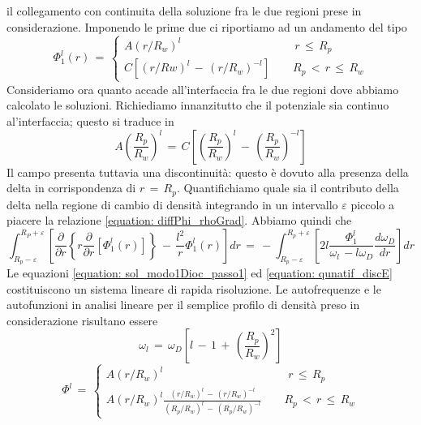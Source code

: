 il collegamento con continuita della soluzione fra le due regioni prese in considerazione. Imponendo le prime due ci riportiamo ad un
andamento del tipo
\begin{equation}
    \Phi_1^l\left(r\right)\,=\,
    \begin{cases}
        A\left(r/R_w\right)^l \qquad \qquad \qquad \qquad \qquad r\,\leq\,R_p\\
        C\left[\left(r/Rw\right)^l\,-\,\left(r/R_w\right)^{-l}\right] \qquad R_p\,<\,r\,\leq\,R_w
    \end{cases}
    \label{equation: sol_modo1Dioc_passo1}
\end{equation}
Consideriamo ora quanto accade all'interfaccia fra le due regioni dove abbiamo calcolato le soluzioni. Richiediamo innanzitutto che
il potenziale sia continuo al'interfaccia; questo si traduce in
\begin{equation}
    A\left(\frac{R_p}{R_w}\right)^l\,=\,C\left[\left(\frac{R_p}{R_w}\right)^l\,-\,\left(\frac{R_p}{R_w}\right)^{-l}\right]
\end{equation}
Il campo presenta tuttavia una discontinuità: questo è dovuto alla presenza della delta in corrispondenza di $r\,=\,R_p$. Quantifichiamo 
quale sia il contributo della delta nella regione di cambio di densità integrando in un intervallo $\varepsilon$ piccolo a piacere la
relazione \eqref{equation: diffPhi_rhoGrad}. Abbiamo quindi che 
\begin{equation}
    \int_{R_p-\varepsilon}^{R_P+\varepsilon} \left[    \frac{\partial}{\partial r}\left\{r\frac{\partial}{\partial r}\left[\Phi^l_1\left(r\right)\right]\right\}\,-\,\frac{l^2}{r}\Phi_1^l\left(r\right)\right] dr\,=\,-\int_{R_p-\varepsilon}^{R_p+\varepsilon} \left[2l\frac{\Phi_1^l}{\omega_l\,-l\omega_D}\frac{d\omega_D}{dr}\right] dr
    \label{equation: qunatif_discE}
\end{equation}
Le equazioni \eqref{equation: sol_modo1Dioc_passo1} ed \eqref{equation: qunatif_discE} costituiscono un sistema lineare di rapida 
risoluzione. Le autofrequenze e le autofunzioni in analisi lineare per il semplice profilo di densità preso in considerazione 
risultano essere
\begin{equation}
    \omega_l\,=\,\omega_D\left[l\,-\,1\,+\,\left(\frac{R_p}{R_w}\right)^2\right]
    \label{equation: autoFreq_lineare}
\end{equation}
\begin{equation}
    \Phi^l\,=\,
    \begin{cases}
        A\left(r/R_w\right)^l  \qquad \qquad \qquad \qquad \qquad \quad r\,\leq\,R_p \\
        A\left(r/R_w\right)^l \frac{\left(r/R_w\right)^l\,-\,\left(r/R_w\right)^{-l}}{\left(R_p/R_w\right)^l\,-\,\left(R_p/R_w\right)^{-l}} \qquad  R_p\,<\,r\,\leq\,R_w
    \end{cases}
    \label{equation: autoFunc_lineare}
\end{equation}
